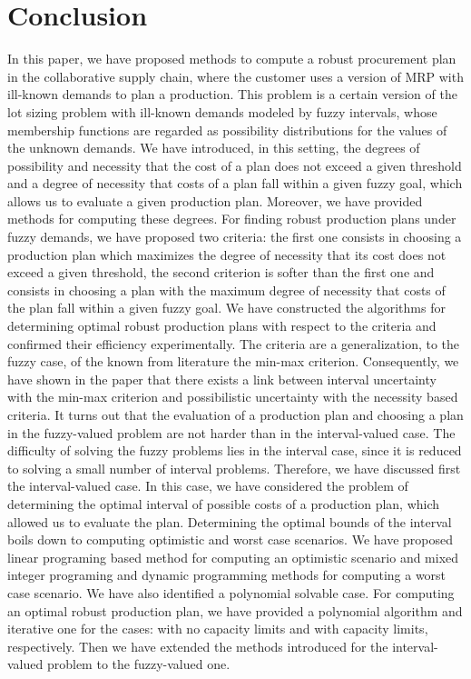 \documentclass[11pt]{article}
\begin{document}
\section{Conclusion}
In this paper, we have proposed  methods to compute a robust procurement plan in the collaborative supply chain, where the customer uses a version of MRP with  ill-known  demands
to  plan a production.
This problem is   a certain  version of 
the lot sizing problem
with  ill-known  demands modeled by
fuzzy intervals, whose membership functions 
are   regarded as possibility distributions for the values of the unknown demands.
We have introduced,  in this setting,
the degrees of possibility and
necessity that   the cost of a plan does   not exceed a given threshold and
a degree of necessity
that costs of a plan fall within 
a given fuzzy goal, which allows us to evaluate a given production plan. Moreover, we have provided
methods for computing these degrees.
For finding robust production plans under fuzzy demands,
we have proposed two criteria:
the first one consists in choosing
 a production plan
which maximizes 
the degree of necessity  that its cost does not exceed  a given threshold,
the second criterion is softer than the first one and consists  in choosing a plan with
 the maximum degree of necessity
that costs of the plan fall within 
a given fuzzy goal. 
We have constructed the algorithms for determining optimal robust production plans 
 with respect to the criteria and confirmed their efficiency experimentally.
The criteria are
a generalization, to the fuzzy case, of the
known from literature the min-max criterion.
Consequently, we have shown in the paper that there exists a link between  
interval uncertainty with the min-max criterion and  possibilistic uncertainty 
with the necessity based criteria.
It turns out that 
the  evaluation of a production plan  and choosing a plan in the fuzzy-valued 
problem are not harder than in the interval-valued case. 
The  difficulty of solving the fuzzy problems lies in the interval case, since it is reduced to
 solving a small number of interval problems.
Therefore,
we have discussed first the interval-valued case.
In this case, we 
have considered the problem of determining the optimal interval of possible costs of
a production plan, which allowed us to evaluate  the plan.
Determining the optimal bounds  of the interval
 boils down to  computing optimistic and worst case scenarios.
We have proposed  linear programing based method for computing an optimistic 
scenario and mixed integer programing and dynamic programming methods for
computing a worst case scenario. We have also identified a polynomial solvable case.
For computing an optimal robust production plan, we have provided 
a polynomial algorithm and iterative one for the cases: with no capacity limits and with
capacity limits, respectively.
Then
 we have extended  the methods
 introduced for the interval-valued problem
to the fuzzy-valued one. 
\end{document}
